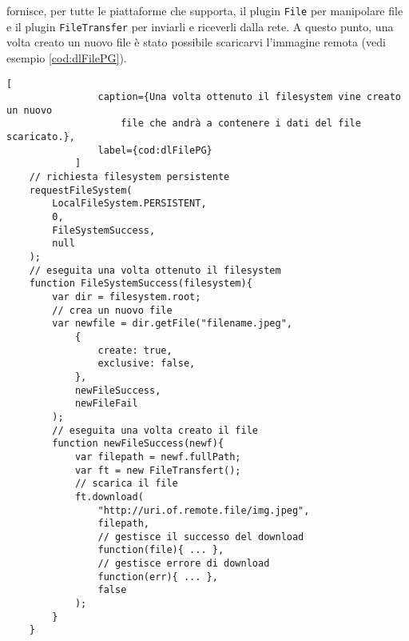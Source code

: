             \pg{} fornisce, per tutte le piattaforme che supporta, il plugin
            \texttt{File} per manipolare file e il plugin \texttt{FileTransfer}
            per inviarli e riceverli dalla rete. A questo punto, una volta
            creato un nuovo file è stato possibile scaricarvi l'immagine remota
            (vedi esempio \ref{cod:dlFilePG}).
            \begin{lstlisting}[
                caption={Una volta ottenuto il filesystem vine creato un nuovo
                    file che andrà a contenere i dati del file scaricato.},
                label={cod:dlFilePG}
            ]
    // richiesta filesystem persistente
    requestFileSystem(
        LocalFileSystem.PERSISTENT,
        0,
        FileSystemSuccess,
        null
    );
    // eseguita una volta ottenuto il filesystem
    function FileSystemSuccess(filesystem){
        var dir = filesystem.root;
        // crea un nuovo file
        var newfile = dir.getFile("filename.jpeg",
            {
                create: true,
                exclusive: false,
            },
            newFileSuccess,
            newFileFail
        );
        // eseguita una volta creato il file
        function newFileSuccess(newf){
            var filepath = newf.fullPath;
            var ft = new FileTransfert();
            // scarica il file
            ft.download(
                "http://uri.of.remote.file/img.jpeg",
                filepath,
                // gestisce il successo del download
                function(file){ ... },
                // gestisce errore di download
                function(err){ ... },
                false
            );
        }
    }
            \end{lstlisting}

